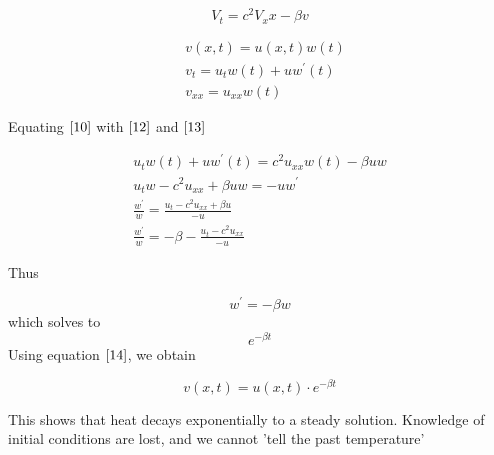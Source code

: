 \documentclass{article}
\begin{document}
\begin{equation}\label{10}
V_t = c^2 V_xx- \beta v
\end{equation}

\begin{align}
&v(x,t) = u(x,t)w(t) \label{14}\\
&v_t = u_tw(t) + uw^{'}(t) \label{12} \\
&v_{xx} = u_{xx}w(t) \label{13}
\end{align}

Equating $\eqref{10}$ with $\eqref{12}$ and $\eqref{13}$

\begin{align*}
u_t w(t) + u w^{'} (t) = c^2u_{xx} w(t) - \beta u w \\
u_t w - c^2 u_{xx}  + \beta u w = -uw^{'} \\
\frac{w^{'}}{w} = \frac{u_t -c^2 u_{xx} + \beta u}{-u} \\
\frac{w^{'}}{w} = -\beta - \frac{u_t-c^2u_{xx}}{-u}
\end{align*}

Thus

$$
w^{'} = -\beta w
$$
which solves to
$$
e^{-\beta t}
$$
Using equation $\eqref{14}$, we obtain

$$v(x,t) = u(x,t) \cdot e^{-\beta t}$$

This shows that heat decays exponentially to a steady solution. Knowledge of initial conditions are lost, and we cannot 'tell the past temperature'
\end{document}
